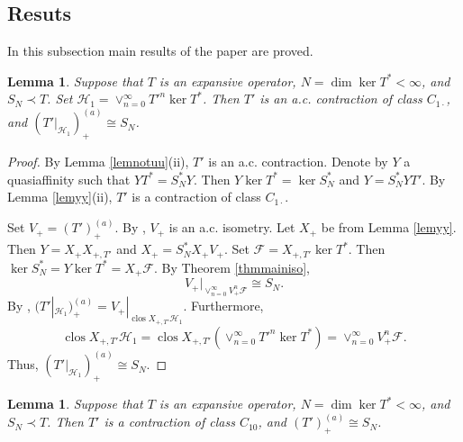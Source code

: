 \documentclass[a4paper,oneside,11pt]{amsart}
\numberwithin{equation}{section}
\theoremstyle{plain}
\newtheorem{lemma}[theorem]{Lemma}
\theoremstyle{definition}
\begin{document}
\subsection{Resuts}

In this subsection main results of the paper are proved.

\begin{lemma}\label{lemmain0} Suppose that  $T$ is an expansive operator,  $N=\dim\ker T^*<\infty$, 
and $S_N\prec T$.  
 Set $\mathcal H_1= \vee_{n=0}^\infty T'^n\ker T^*$. 
Then $T'$ is an a.c.  contraction of class $C_{1\cdot}$, and $(T'|_{\mathcal H_1})_+^{(a)}\cong S_N$.
\end{lemma}  
\begin{proof} By Lemma \ref{lemnotuu}(ii), $T'$ is an a.c. contraction. 
Denote by $Y$  a quasiaffinity such that $YT^*=S_N^*Y$. Then $Y\ker T^*=\ker S_N^*$ and 
$Y=S_N^*YT'$. By Lemma \ref{lemyy}(ii), $T'$ is a contraction of class $C_{1\cdot}$. 

 Set  $V_+=(T')^{(a)}_+$. By {\cite[Sec. IX.1]{nfbk}}, $V_+$ is an a.c. isometry. Let $X_+$ be from Lemma \ref{lemyy}.
Then $Y=X_+X_{+,T'}$ and  $X_+=S_N^*X_+V_+$. Set $\mathcal F=X_{+,T'}\ker T^*$. Then  $\ker S_N^*=Y\ker T^*=X_+\mathcal F$. By Theorem \ref{thmmainiso}, 
\begin{equation*} V_+|_{\vee_{n=0}^\infty V_+^n\mathcal F}\cong S_N.\end{equation*}
By \cite{ker89},  $(T'|_{\mathcal H_1})_+^{(a)}=V_+|_{\operatorname{clos}X_{+,T'}\mathcal H_1}$. Furthermore,  
  \begin{equation*}  
\operatorname{clos}X_{+,T'}\mathcal H_1=\operatorname{clos}X_{+,T'}(\vee_{n=0}^\infty T'^n\ker T^*)=
\vee_{n=0}^\infty V_+^n\mathcal F.
\end{equation*}
Thus, $(T'|_{\mathcal H_1})_+^{(a)}\cong S_N$.  
\end{proof}


\begin{lemma}\label{lemc0} Suppose that  $T$ is an expansive operator,   $N=\dim\ker T^*<\infty$, and $S_N\prec T$.
  Then   $T'$ is a contraction of class $C_{10}$, and $(T')_+^{(a)}\cong S_N$.
\end{lemma}  
\end{document}
